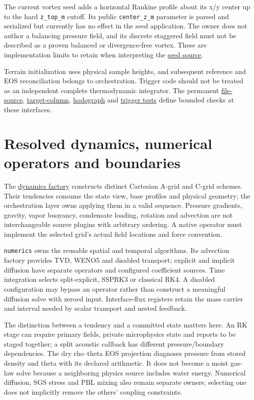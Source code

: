 The current vortex seed adds a horizontal Rankine profile about its x/y center
up to the hard \texttt{z\_top\_m} cutoff. Its public
\texttt{center\_z\_m} parameter is parsed and serialized but currently has no
effect in the seed application. The owner does not author a balancing pressure
field, and its discrete staggered field must not be described as a proven
balanced or divergence-free vortex. These are implementation limits to retain
when interpreting the \href{../src/init/trigger/sources/vortex_seed.cpp}{seed source}.

Terrain initialization uses physical sample heights, and subsequent reference
and EOS reconciliation belongs to orchestration. Trigger code should not be
treated as an independent complete thermodynamic integrator. The permanent
\href{../tests/init/test_file_sounding.cpp}{file-source},
\href{../tests/init/test_parametric_targets_sounding.cpp}{target-column},
\href{../tests/init/test_hodograph_sources.cpp}{hodograph} and
\href{../tests/init/test_vortex_seed_trigger.cpp}{trigger tests} define bounded
checks at these interfaces.

\section{Resolved dynamics, numerical operators and boundaries}

The \href{../src/dynamics/factory.cpp}{dynamics factory} constructs distinct
Cartesian A-grid and C-grid schemes. Their tendencies consume the state view,
base profiles and physical geometry; the orchestration layer owns applying
them in a valid sequence. Pressure gradients, gravity, vapor buoyancy,
condensate loading, rotation and advection are not interchangeable source
plugins with arbitrary ordering. A native operator must implement the selected
grid's actual field locations and force convention.

\texttt{numerics} owns the reusable spatial and temporal algorithms. Its
advection factory provides TVD, WENO5 and disabled transport; explicit and
implicit diffusion have separate operators and configured coefficient sources.
Time integration selects split-explicit, SSPRK3 or classical RK4. A disabled
configuration may bypass an operator rather than construct a meaningful
diffusion solve with zeroed input. Interface-flux registers retain the mass
carrier and interval needed by scalar transport and nested feedback.

The distinction between a tendency and a committed state matters here. An RK
stage can require primary fields, private microphysics state and reports to be
staged together; a split acoustic callback has different pressure/boundary
dependencies. The dry rho--theta EOS projection diagnoses pressure from stored
density and theta with its declared arithmetic. It does not become a moist
gas-law solve because a neighboring physics source includes water energy.
Numerical diffusion, SGS stress and PBL mixing also remain separate owners;
selecting one does not implicitly remove the others' coupling constraints.

